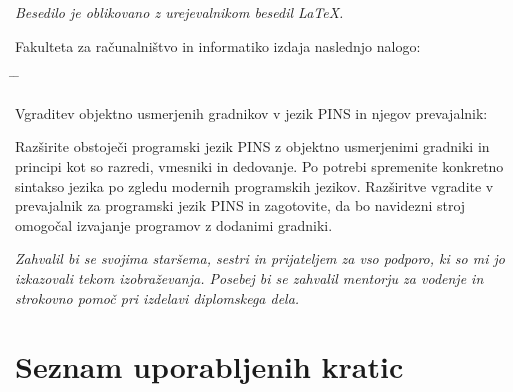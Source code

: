 \documentclass[a4paper, 12p]{book}
\newcommand{\clearemptydoublepage}{\newpage{\pagestyle{empty}\cleardoublepage}}
\begin{document}
\begin{center}
\mbox{}\vfill
\emph{Besedilo je oblikovano z urejevalnikom besedil \LaTeX.}
\end{center}
\clearemptydoublepage

\thispagestyle{empty}
\vspace*{4cm}

\noindent
Fakulteta za računalništvo in informatiko izdaja naslednjo nalogo:
\medskip
\begin{tabbing}
\hspace{32mm}\= \hspace{6cm} \= \kill


Vgraditev objektno usmerjenih gradnikov v jezik PINS in njegov prevajalnik:
\end{tabbing}
Razširite obstoječi programski jezik PINS z objektno usmerjenimi gradniki in principi kot so razredi, vmesniki in dedovanje. Po potrebi spremenite konkretno sintakso jezika po zgledu modernih programskih jezikov. Razširitve vgradite v prevajalnik za programski jezik PINS in zagotovite, da bo navidezni stroj omogočal izvajanje programov z dodanimi gradniki.
\vspace{15mm}






\vspace{2cm}

\clearemptydoublepage

\thispagestyle{empty}\mbox{}\vfill\null\it%
\noindent
Zahvalil bi se svojima staršema, sestri in prijateljem za vso podporo, ki so mi jo izkazovali tekom izobraževanja. Posebej bi se zahvalil mentorju za vodenje in strokovno pomoč pri izdelavi diplomskega dela.
\rm\normalfont

\clearemptydoublepage

\pagestyle{empty}
\def\thepage{}%
\tableofcontents{}


\clearemptydoublepage


\chapter*{Seznam uporabljenih kratic}  %
\end{document}
